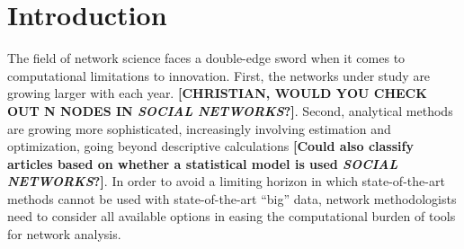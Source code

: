 \documentclass[10pt, conference, compsocconf]{IEEEtran}
\begin{document}
\section{Introduction}
\noindent The field of network science faces a double-edge sword when it comes to computational limitations to innovation. First, the networks under study are growing larger with each year. {\bf [CHRISTIAN, WOULD YOU CHECK OUT N NODES IN {\em SOCIAL NETWORKS}?]}. Second, analytical methods are growing more sophisticated, increasingly involving estimation and optimization, going beyond descriptive calculations {\bf [Could also classify articles based on whether a statistical model is used {\em SOCIAL NETWORKS}?]}. In order to avoid a limiting horizon in which state-of-the-art methods cannot be used with state-of-the-art ``big'' data, network methodologists need to consider all available options in easing the computational burden of tools for network analysis.
\end{document}
